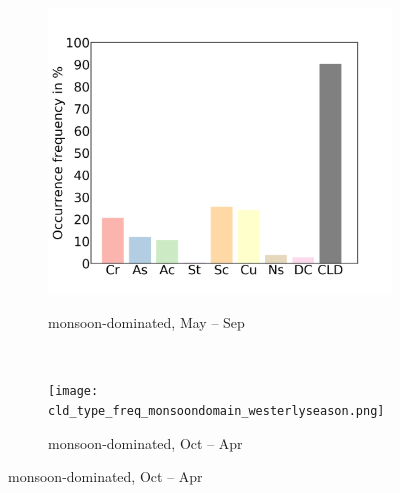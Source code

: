 \documentclass[alpha-refs]{wiley-article}
\begin{document}
\begin{figure}[!htbp]
    \bigskip
   
    \begin{subfigure}[b]{0.5\textwidth}
        \centering
        \caption{monsoon-dominated, May -- Sep}        
        \includegraphics[width=\textwidth]{cld_type_freq_monsoondomain_monsoonseason.png}
        \label{fig:cld_type3}
    \end{subfigure} 
    ~
    \begin{subfigure}[b]{0.5\textwidth}
        \centering
        \caption{monsoon-dominated, Oct -- Apr }        
        \texttt{[image: cld\_type\_freq\_monsoondomain\_westerlyseason.png]}
        \label{fig:cld_type4}
    \end{subfigure}%
    
    \bigskip 
    

\end{figure}
\end{document}
